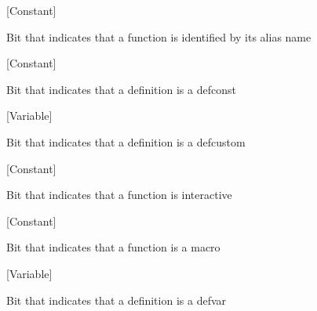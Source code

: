 \vspace{1em}
\noindent
{}
\usebox{\funcname}
 \hfill [Constant]

\begin{doc-string}
Bit that indicates that a function is identified by its alias name
\end{doc-string}

\vspace{1em}
\noindent
{}
\usebox{\funcname}
 \hfill [Constant]

\begin{doc-string}
Bit that indicates that a definition is a defconst
\end{doc-string}

\vspace{1em}
\noindent
{}
\usebox{\funcname}
 \hfill [Variable]

\begin{doc-string}
Bit that indicates that a definition is a defcustom
\end{doc-string}

\vspace{1em}
\noindent
{}
\usebox{\funcname}
 \hfill [Constant]

\begin{doc-string}
Bit that indicates that a function is interactive
\end{doc-string}

\vspace{1em}
\noindent
{}
\usebox{\funcname}
 \hfill [Constant]

\begin{doc-string}
Bit that indicates that a function is a macro
\end{doc-string}

\vspace{1em}
\noindent
{}
\usebox{\funcname}
 \hfill [Variable]

\begin{doc-string}
Bit that indicates that a definition is a defvar
\end{doc-string}

